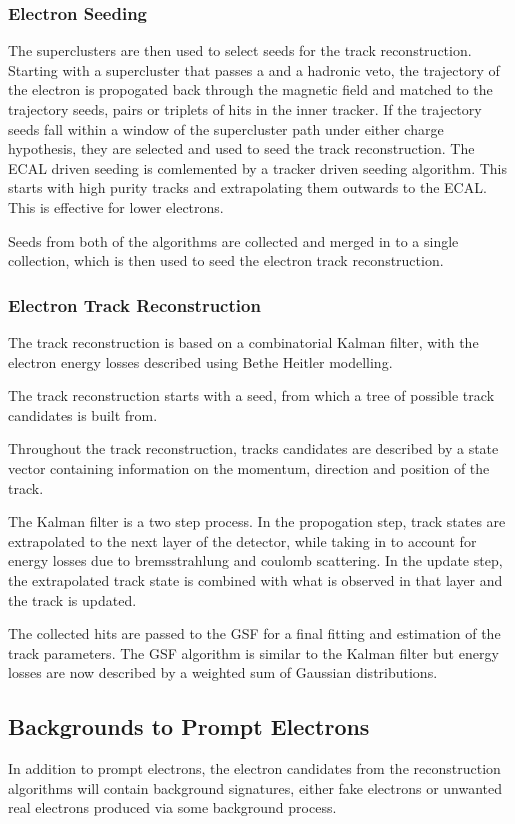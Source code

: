 \subsubsection{Electron Seeding}
The superclusters are then used to select seeds for the track reconstruction.
Starting with a supercluster that passes a \pt and a hadronic veto, the
trajectory of the electron is propogated back through the magnetic field and
matched to the trajectory seeds, pairs or triplets of hits in the inner tracker.
If the trajectory seeds fall within a window of the supercluster path under
either charge hypothesis, they are selected and used to seed the track
reconstruction.
The ECAL driven seeding is comlemented by a tracker driven seeding algorithm.
This starts with high purity tracks and extrapolating them outwards to the ECAL.
This is effective for lower \pt electrons.

Seeds from both of the algorithms are collected and merged in to a single
collection, which is then used to seed the electron track reconstruction.

\subsubsection{Electron Track Reconstruction}
The track reconstruction is based on a combinatorial Kalman filter, with the electron energy losses described using Bethe Heitler
modelling.

The track reconstruction starts with a seed, from which a tree of possible track
candidates is built from. 

Throughout the track reconstruction, tracks candidates are described by a state
vector containing information on the momentum, direction and position of the
track.

The Kalman filter is a
two step process. In the propogation step, track states are extrapolated to
the next layer of the detector, while taking in to account for energy losses due
to bremsstrahlung and coulomb scattering. 
In the update step, the extrapolated track state is 
combined with what is observed in that layer and the track is updated. 

The collected hits are passed to the GSF for a final fitting and estimation of
the track parameters. The GSF algorithm is similar to the Kalman filter but
energy losses are now described by a weighted sum of Gaussian distributions.

\subsection{Backgrounds to Prompt Electrons}
In addition to prompt electrons, the electron candidates from the reconstruction
algorithms will contain background signatures, either fake electrons or unwanted
real electrons produced via some background process.

